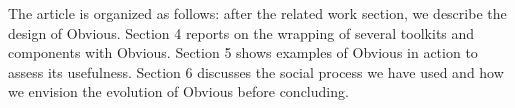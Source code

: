 \begin{comment}
A typical scenario of Obvious would be the design of
VizTree~\cite{lin01}, a VA application for monitoring
massive time-series.  VizTree encodes very long time-series of a
continuous value as a suffix tree; the details of this encoding being
beyond the scope of the paragraph scenario.  The associated tree
visualization has been implemented by specialists of data-mining and
leaves room for improvements in term of visualization and
interaction.  Using Obvious, the authors would first connect their
computed data structure to the data model of Obvious. There are two
ways of doing that: use the Obvious data-model directly or use the
native data-model implemented for mining the time-series and wrap it
with an implementation of the Obvious data-model. Both are possible
and will be chosen according to the amount of work and flexibility
offered by one option or the other. Once an Obvious data-model is
available, the authors of VisTree can start exploring which toolkit
will provide them the best support for their visualization. They can
choose among the InfoVis Toolkit, Prefuse and JUNG to visualize tree
data. Once the best one has been chosen, the interaction can be
crafted either on top of the abstraction provided by Obvious - to keep
the option of switching the final implementation - or using the native
toolkit controls to keep a tighter control of the interface. If
desired, the interface can also be improved by adding other
visualizations associated with the computation of the prefix tree or
of statistics associated with the data. If multiple-coordinated views
are required for that, Improvise visualization and views can be added
to the interface using the same data model. In that scenario, Obvious
has enabled data-mining researchers to focus on their skills and to
use state-of-the-art visualization components at a later stage of the
development of their application.

Another scenario [DDupe]

Yet another, more futuristic scenario: porting a new visualization type to multiple toolkits
or allowing cross-toolkit brushing interaction.

\end{comment}

The article is organized as follows: after the related work section,
we describe the design of Obvious. Section 4 reports on the wrapping
of several toolkits and components with Obvious. Section 5 shows
examples of Obvious in action to assess its usefulness. Section 6
discusses the social process we have used and how we envision the
evolution of Obvious before concluding.
